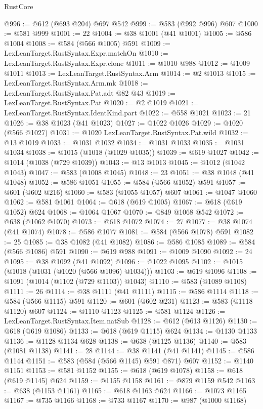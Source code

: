 \begin{lexlean}{RustCore}
\begin{coremodule}
@996 := @612 (@693 @204) @697 @542
@999 := @583 (@992 @996) @607
@1000 := @581 @999
@1001 := 22
@1004 := @38 @1001 (@41 @1001)
@1005 := @586 @1004
@1008 := @584 (@566 @1005) @591
@1009 := LexLeanTarget.RustSyntax.Expr.matchOn
@1010 := LexLeanTarget.RustSyntax.Expr.clone
@1011 := @1010 @988
@1012 := @1009 @1011
@1013 := LexLeanTarget.RustSyntax.Arm
@1014 := @2 @1013
@1015 := LexLeanTarget.RustSyntax.Arm.mk
@1018 := LexLeanTarget.RustSyntax.Pat.adt @82 @43
@1019 := LexLeanTarget.RustSyntax.Pat
@1020 := @2 @1019
@1021 := LexLeanTarget.RustSyntax.IdentKind.part
@1022 := @558 @1021
@1023 := 21
@1026 := @38 @1023 (@41 @1023)
@1027 := @1022 @1026
@1029 := @1020 (@566 @1027)
@1031 := @1020 LexLeanTarget.RustSyntax.Pat.wild
@1032 := @13 @1019
@1033 := @1031 @1032
@1034 := @1031 @1033
@1035 := @1031 @1034
@1038 := @1015 (@1018 (@1029 @1035))
@1039 := @619 @1027
@1042 := @1014 (@1038 (@729 @1039))
@1043 := @13 @1013
@1045 := @1012 (@1042 @1043)
@1047 := @583 (@1008 @1045)
@1048 := 23
@1051 := @38 @1048 (@41 @1048)
@1052 := @586 @1051
@1055 := @584 (@566 @1052) @591
@1057 := @601 (@602 @216)
@1060 := @583 (@1055 @1057) @607
@1061 := @1047 @1060
@1062 := @581 @1061
@1064 := @618 (@619 @1005)
@1067 := @618 (@619 @1052) @624
@1068 := @1064 @1067
@1070 := @849 @1068 @542
@1072 := @638 (@1062 @1070)
@1073 := @618 @1072
@1074 := 27
@1077 := @38 @1074 (@41 @1074)
@1078 := @586 @1077
@1081 := @584 (@566 @1078) @591
@1082 := 25
@1085 := @38 @1082 (@41 @1082)
@1086 := @586 @1085
@1089 := @584 (@566 @1086) @591
@1090 := @619 @988
@1091 := @1009 @1090
@1092 := 24
@1095 := @38 @1092 (@41 @1092)
@1096 := @1022 @1095
@1102 := @1015 (@1018 (@1031 (@1020 (@566 @1096) @1034)))
@1103 := @619 @1096
@1108 := @1091 (@1014 (@1102 (@729 @1103)) @1043)
@1110 := @583 (@1089 @1108)
@1111 := 26
@1114 := @38 @1111 (@41 @1111)
@1115 := @586 @1114
@1118 := @584 (@566 @1115) @591
@1120 := @601 (@602 @231)
@1123 := @583 (@1118 @1120) @607
@1124 := @1110 @1123
@1125 := @581 @1124
@1126 := LexLeanTarget.RustSyntax.Item.natSub
@1128 := @612 (@613 @1126)
@1130 := @618 (@619 @1086)
@1133 := @618 (@619 @1115) @624
@1134 := @1130 @1133
@1136 := @1128 @1134 @628
@1138 := @638 (@1125 @1136)
@1140 := @583 (@1081 @1138)
@1141 := 28
@1144 := @38 @1141 (@41 @1141)
@1145 := @586 @1144
@1151 := @583 (@584 (@566 @1145) @591 @871) @607
@1152 := @1140 @1151
@1153 := @581 @1152
@1155 := @618 (@619 @1078)
@1158 := @618 (@619 @1145) @624
@1159 := @1155 @1158
@1161 := @879 @1159 @542
@1163 := @638 (@1153 @1161)
@1165 := @618 @1163 @624
@1166 := @1073 @1165
@1167 := @735 @1166
@1168 := @733 @1167
@1170 := @987 (@1000 @1168)

\end{coremodule}
\end{lexlean}
